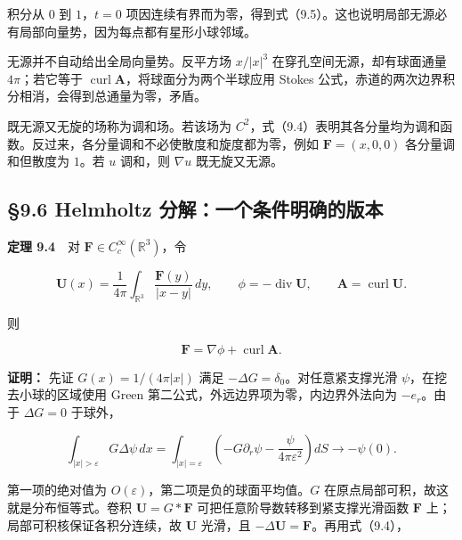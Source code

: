 \documentclass[11pt,a4paper]{article}
\begin{document}
积分从 \(0\) 到 \(1\)，\(t=0\)
项因连续有界而为零，得到式（9.5）。这也说明局部无源必有局部向量势，因为每点都有星形小球邻域。

无源并不自动给出全局向量势。反平方场 \(x/|x|^3\)
在穿孔空间无源，却有球面通量 \(4\pi\)；若它等于
\(\operatorname{curl}\mathbf A\)，将球面分为两个半球应用 Stokes
公式，赤道的两次边界积分相消，会得到总通量为零，矛盾。

既无源又无旋的场称为调和场。若该场为
\(C^2\)，式（9.4）表明其各分量均为调和函数。反过来，各分量调和不必使散度和旋度都为零，例如
\(\mathbf F=(x,0,0)\) 各分量调和但散度为 \(1\)。若 \(u\) 调和，则
\(\nabla u\) 既无旋又无源。

\subsection{§9.6 Helmholtz
分解：一个条件明确的版本}\label{helmholtz-ux5206ux89e3ux4e00ux4e2aux6761ux4ef6ux660eux786eux7684ux7248ux672c}

\textbf{定理 9.4}　对 \(\mathbf F\in C_c^\infty(\mathbb R^3)\)，令

\begin{equation*}
 \mathbf U(x)=\frac1{4\pi}\int_{\mathbb R^3}\frac{\mathbf F(y)}{|x-y|}\,dy,
 \qquad \phi=-\operatorname{div}\mathbf U,
 \qquad \mathbf A=\operatorname{curl}\mathbf U.
\end{equation*}

则

\begin{equation*}
 \mathbf F=\nabla\phi+\operatorname{curl}\mathbf A.\tag{9.6}
\end{equation*}

\textbf{证明：} 先证 \(G(x)=1/(4\pi|x|)\) 满足
\(-\Delta G=\delta_0\)。对任意紧支撑光滑 \(\psi\)，在挖去小球的区域使用
Green 第二公式，外远边界项为零，内边界外法向为 \(-e_r\)。由于
\(\Delta G=0\) 于球外，

\begin{equation*}
 \int_{|x|>\varepsilon}G\Delta\psi\,dx
 =\int_{|x|=\varepsilon}
 \left(-G\partial_r\psi-\frac{\psi}{4\pi\varepsilon^2}\right)dS
 \longrightarrow-\psi(0).
\end{equation*}

第一项的绝对值为 \(O(\varepsilon)\)，第二项是负的球面平均值。\(G\)
在原点局部可积，故这就是分布恒等式。卷积 \(\mathbf U=G*\mathbf F\)
可把任意阶导数转移到紧支撑光滑函数 \(\mathbf F\)
上；局部可积核保证各积分连续，故 \(\mathbf U\) 光滑，且
\(-\Delta\mathbf U=\mathbf F\)。再用式（9.4），
\end{document}
